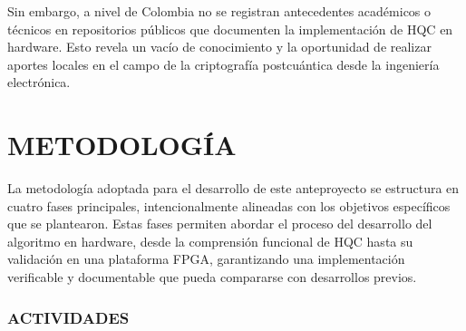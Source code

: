 Sin embargo, a nivel de Colombia no se registran antecedentes académicos o técnicos en repositorios públicos que documenten la implementación de HQC en hardware. Esto revela un vacío de conocimiento y la oportunidad de realizar aportes locales en el campo de la criptografía postcuántica desde la ingeniería electrónica.

\chapter{METODOLOGÍA}
La metodología adoptada para el desarrollo de este anteproyecto se estructura en cuatro fases principales, intencionalmente alineadas con los objetivos específicos que se plantearon. Estas fases permiten abordar el proceso del desarrollo del algoritmo en hardware, desde la comprensión funcional de HQC hasta su validación en una plataforma FPGA, garantizando una implementación verificable y documentable que pueda compararse con desarrollos previos.

\subsection*{ACTIVIDADES}

